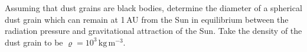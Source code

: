 Assuming that dust grains are black bodies, determine the diameter of a
spherical dust grain which can remain at 1\,AU from the Sun in equilibrium
between the radiation pressure and gravitational attraction of the Sun. Take
the density of the dust grain to be
$\varrho = 10^{3}\,\mathrm{kg\,m^{-3}}$.
